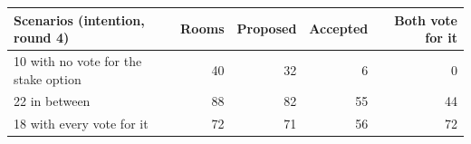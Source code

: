 \begin{tabular}{@{}lrrrr@{}}
\toprule
Scenarios (intention, round 4) & Rooms & Proposed & Accepted & Both vote for it \\
\midrule
10 with no vote for the stake option & 40 & 32 & 6 & 0 \\
22 in between & 88 & 82 & 55 & 44 \\
18 with every vote for it & 72 & 71 & 56 & 72 \\
\bottomrule
\end{tabular}
